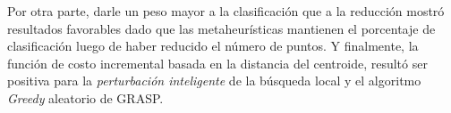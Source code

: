 \documentclass{ci5652}
\begin{document}
Por otra parte, darle un peso mayor a la clasificación que a la reducción mostró resultados favorables dado que las metaheurísticas mantienen el porcentaje de clasificación luego de haber reducido el número de puntos. Y finalmente, la función de costo incremental basada en la distancia del centroide, resultó ser positiva para la \textit{perturbación inteligente} de la búsqueda local y el algoritmo \textit{Greedy} aleatorio de GRASP.

\small



\end{document}
